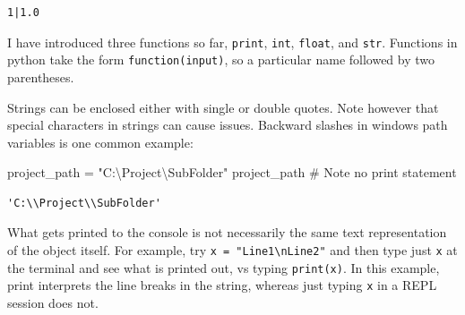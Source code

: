 \documentclass[
  letterpaper,
]{scrbook}
\newenvironment{Shaded}{\begin{snugshade}}{\end{snugshade}}
\newcommand{\CommentTok}[1]{\textcolor[rgb]{0.37,0.37,0.37}{#1}}
\newcommand{\NormalTok}[1]{\textcolor[rgb]{0.00,0.23,0.31}{#1}}
\newcommand{\OperatorTok}[1]{\textcolor[rgb]{0.37,0.37,0.37}{#1}}
\newcommand{\StringTok}[1]{\textcolor[rgb]{0.13,0.47,0.30}{#1}}
\begin{document}
\begin{verbatim}
1|1.0
\end{verbatim}

\begin{tcolorbox}[enhanced jigsaw, toprule=.15mm, rightrule=.15mm, arc=.35mm, opacityback=0, coltitle=black, bottomrule=.15mm, left=2mm, opacitybacktitle=0.6, bottomtitle=1mm, colback=white, colframe=quarto-callout-note-color-frame, colbacktitle=quarto-callout-note-color!10!white, titlerule=0mm, breakable, title={Note}, toptitle=1mm, leftrule=.75mm]

I have introduced three functions so far, \texttt{print}, \texttt{int},
\texttt{float}, and \texttt{str}. Functions in python take the form
\texttt{function(input)}, so a particular name followed by two
parentheses.

\end{tcolorbox}

Strings can be enclosed either with single or double quotes. Note
however that special characters in strings can cause issues. Backward
slashes in windows path variables is one common example:

\begin{Shaded}
\begin{Highlighting}[]
\NormalTok{project\_path }\OperatorTok{=} \StringTok{"C:\textbackslash{}Project\textbackslash{}SubFolder"}
\NormalTok{project\_path }\CommentTok{\# Note no print statement}
\end{Highlighting}
\end{Shaded}

\begin{verbatim}
'C:\\Project\\SubFolder'
\end{verbatim}

\begin{tcolorbox}[enhanced jigsaw, toprule=.15mm, rightrule=.15mm, arc=.35mm, opacityback=0, coltitle=black, bottomrule=.15mm, left=2mm, opacitybacktitle=0.6, bottomtitle=1mm, colback=white, colframe=quarto-callout-note-color-frame, colbacktitle=quarto-callout-note-color!10!white, titlerule=0mm, breakable, title={Note}, toptitle=1mm, leftrule=.75mm]

What gets printed to the console is not necessarily the same text
representation of the object itself. For example, try
\texttt{x\ =\ "Line1\textbackslash{}nLine2"} and then type just
\texttt{x} at the terminal and see what is printed out, vs typing
\texttt{print(x)}. In this example, print interprets the line breaks in
the string, whereas just typing \texttt{x} in a REPL session does not.

\end{tcolorbox}
\end{document}
